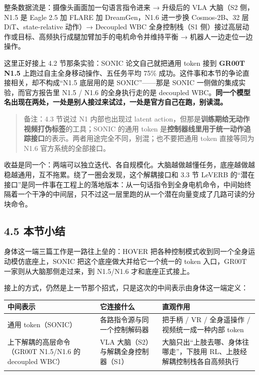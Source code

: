 \documentclass[
  chinese,
]{ctexart}
\begin{document}
整条数据流是：摄像头画面加一句语言指令进来 → 升级后的 VLA 大脑（S2
侧，N1.5 是 Eagle 2.5 加 FLARE 加 DreamGen，N1.6 进一步换 Cosmos-2B、32
层 DiT、state-relative 动作）→ Decoupled WBC 全身控制栈（S1
侧）接过高层动作或目标、高频执行成腿加臂加手的电机命令并维持平衡 →
机器人一边走位一边操作。

这里正好接上 4.2 节那条实验：SONIC 论文自己就把通用 token 接到
\textbf{GR00T N1.5} 上跑过自主全身移动操作、五任务平均 75\%
成功。这件事和本节的争论直接相关，却不构成``N1.5 底层用的是
SONIC''------那是 SONIC 一侧做的集成实验，而官方报告里 N1.5 / N1.6
的全身执行走的是 decoupled
WBC。\textbf{同一个模型名出现在两处，一处是别人接过来试过，一处是官方自己在跑，别读混。}

\begin{quote}
备注：4.3 节说过 N1 内部也出现过 latent
action，但那是\textbf{训练期给无动作视频打伪标签}的工具；SONIC 的通用
token
是\textbf{控制器线里用于统一动作追踪接口}的表示。两者用途完全不同，别混；也不要把通用
token 直接等同为 N1.6 官方系统的全部接口。
\end{quote}

收益是同一个：两端可以独立迭代、各自规模化。大脑越做越懂任务，底座越做越稳越通用，互不拖累。绕了一圈会发现，这个解耦接口和
3.3 节 LeVERB
的``潜在接口''是同一件事在工程上的落地版本：从一句话指令到全身电机命令，中间始终隔着一个干净的中间层，只不过这一层里跑的从一个潜在向量变成了几路可读的分块命令。

\subsection{4.5 本节小结}\label{ux672cux8282ux5c0fux7ed3-3}

身体这一端三篇工作是一路往上垒的：HOVER
把各种控制模式收到同一个全身运动模仿底座上，SONIC
把这个底座做大并给它一个统一的 token 入口，GR00T
一家则从大脑那侧走过来，到 N1.5/N1.6 才和底座正式接上。

接上的方式，仍然是上一节那个招式，只是这次的中间表示由身体这一端定义：

\begin{center}
\begin{tabular}{@{}>{\raggedright\arraybackslash}p{} >{\raggedright\arraybackslash}p{} >{\raggedright\arraybackslash}p{}@{}}
\toprule\noalign{}
中间表示 & 它连接什么 & 直观作用 \\
\midrule\noalign{}
通用 token（SONIC） & 各路指令源与同一个控制解码器 & 把手柄 / VR / 全身遥操作 / 视频统一成一种内部 token \\
上下解耦的高层命令（GR00T N1.5/N1.6 的 decoupled WBC） & VLA 大脑（S2）与解耦全身控制器（S1） & 大脑只出``上肢去哪、身体往哪走''，下肢用 RL、上肢经解耦控制栈各自高频执行 \\
\bottomrule\noalign{}
\end{tabular}
\end{center}
\end{document}
